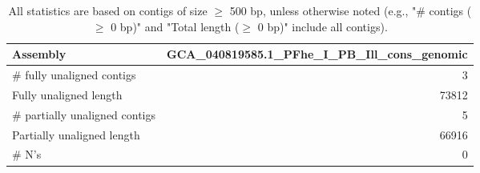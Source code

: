 \documentclass[12pt,a4paper]{article}
\begin{document}
\begin{table}[ht]
\begin{center}
\caption{All statistics are based on contigs of size $\geq$ 500 bp, unless otherwise noted (e.g., "\# contigs ($\geq$ 0 bp)" and "Total length ($\geq$ 0 bp)" include all contigs).}
\begin{tabular}{|l*{1}{|r}|}
\hline
Assembly & GCA\_040819585.1\_PFhe\_I\_PB\_Ill\_cons\_genomic \\ \hline
\# fully unaligned contigs & 3 \\ \hline
Fully unaligned length & 73812 \\ \hline
\# partially unaligned contigs & 5 \\ \hline
Partially unaligned length & 66916 \\ \hline
\# N's & 0 \\ \hline
\end{tabular}
\end{center}
\end{table}
\end{document}
